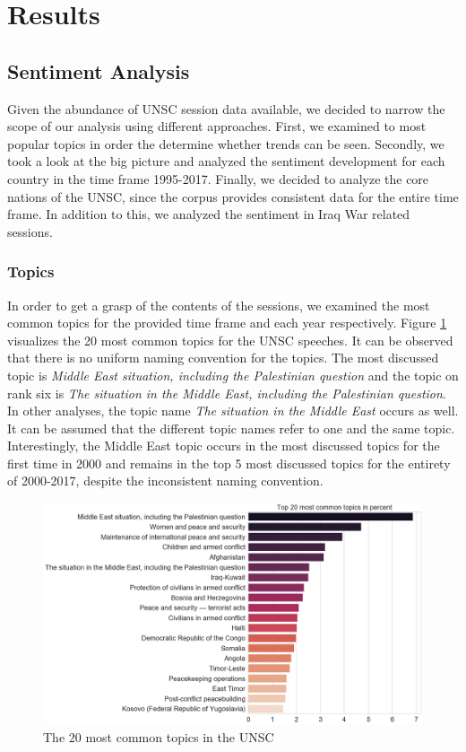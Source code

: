 \section{Results}
\label{results}

\subsection{Sentiment Analysis}
Given the abundance of UNSC session data available, we decided to narrow the scope of our analysis using different approaches. First, we examined to most popular topics in order the determine whether trends can be seen. Secondly, we took a look at the big picture and analyzed the sentiment development for each country in the time frame 1995-2017. Finally, we decided to analyze the core nations of the UNSC, since the corpus provides consistent data for the entire time frame. In addition to this, we analyzed the sentiment in Iraq War related sessions. 
\subsubsection{Topics}
In order to get a grasp of the contents of the sessions, we examined the most common topics for the provided time frame and each year respectively. Figure \ref{common_1} visualizes the 20 most common topics for the UNSC speeches. It can be observed that there is no uniform naming convention for the topics. The most discussed topic is \textit{Middle East situation, including the Palestinian question} and the topic on rank six is \textit{The situation in the Middle East, including the Palestinian question}. In other analyses, the topic name \textit{The situation in the Middle East} occurs as well. It can be assumed that the different topic names refer to one and the same topic.  
Interestingly, the Middle East topic occurs in the most discussed topics for the first time in 2000 and remains in the top 5 most discussed topics for the entirety of 2000-2017, despite the inconsistent naming convention.

\begin{figure}[t]
  \centering
  \includegraphics[width=14.5cm]{img/20most_common_topics.png}
  \caption{The 20 most common topics in the UNSC}
  \label{common_1}
\end{figure}%

